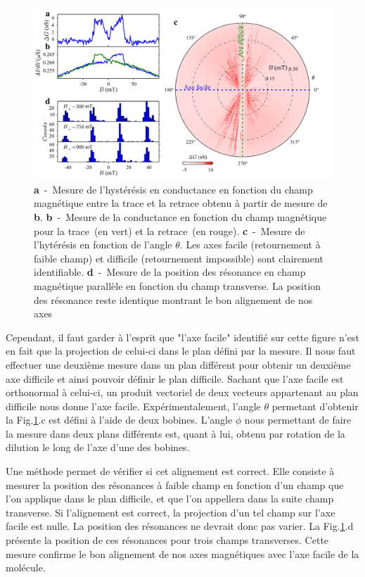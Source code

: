 \begin{figure}
\includegraphics[scale=0.45]{Resultats/Chap1/Figure5/figure5.pdf} 
\caption{\textbf{a}~-~Mesure de l’hystérésis en conductance en fonction du champ magnétique entre la trace et la retrace obtenu à partir de mesure de \textbf{b}. \textbf{b}~-~Mesure de la conductance en fonction du champ magnétique pour la trace~(en vert) et la retrace~(en rouge). \textbf{c}~-~Mesure de l'hytérésis en fonction de l'angle $\theta$. Les axes facile (retournement à faible champ) et difficile (retournement impossible) sont clairement identifiable. \textbf{d}~-~Mesure de la position des résonance en champ magnétique parallèle en fonction du champ transverse. La position des résonance reste identique montrant le bon alignement de nos axes}
\label{alignement}
\end{figure}

Cependant, il faut garder à l'esprit que "l'axe facile" identifié sur cette figure n'est en fait que la projection de celui-ci dans le plan défini par la mesure. Il nous faut effectuer une deuxième mesure dans un plan différent pour obtenir un deuxième axe difficile et ainsi pouvoir définir le plan difficile. Sachant que l'axe facile est orthonormal à celui-ci, un produit vectoriel de deux vecteurs appartenant au plan difficile nous donne l'axe facile. Expérimentalement, l'angle $\theta$ permetant d'obtenir la Fig.\ref{alignement}.c est défini à l'aide de deux bobines. L'angle $\phi$ nous permettant de faire la mesure dans deux plans différents est, quant à lui, obtenu par rotation de la dilution le long de l'axe d'une des bobines.


Une méthode permet de vérifier si cet alignement est correct.  Elle consiste à mesurer la position des résonances à faible champ en fonction d'un champ que l'on applique dans le plan difficile, et que l'on appellera dans la suite champ transverse. Si l'alignement est correct, la projection d'un tel champ sur l'axe facile est nulle. La position des résonances ne devrait donc pas varier. La Fig.\ref{alignement}.d présente la position de ces résonances pour trois champs transverses. Cette mesure confirme le bon alignement de nos axes magnétiques avec l'axe facile de la molécule.

